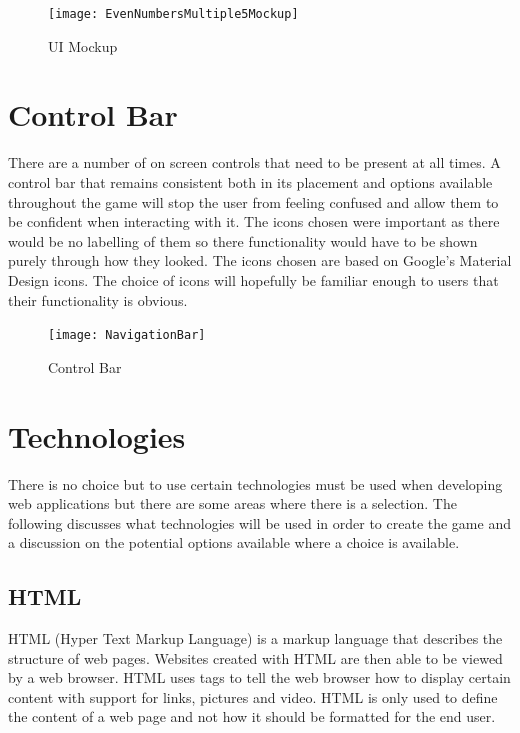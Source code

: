 \documentclass[12pt,a4paper]{report}
\begin{document}
\begin{figure}[h]
  \centering
  \begin{minipage}[b]{1\textwidth}
    \texttt{[image: EvenNumbersMultiple5Mockup]}
    \caption{UI Mockup}
  \end{minipage}
\end{figure}
\FloatBarrier

\section{Control Bar}
There are a number of on screen controls that need to be present at all times. A control bar that remains consistent both in its placement and options available throughout the game will stop the user from feeling confused and allow them to be confident when interacting with it. The icons chosen were important as there would be no labelling of them so there functionality would have to be shown purely through how they looked. The icons chosen are based on Google's Material Design icons. The choice of icons will hopefully be familiar enough to users that their functionality is obvious.

\begin{figure}[h]
\centering
    \texttt{[image: NavigationBar]}
    \caption{Control Bar}
    \label{fig:floodFillBad}
\end{figure}
\FloatBarrier

\section{Technologies}
There is no choice but to use certain technologies must be used when developing web applications but there are some areas where there is a selection. The following discusses what technologies will be used in order to create the game and a discussion on the potential options available where a choice is available. 

\subsection{HTML}
HTML (Hyper Text Markup Language) is a markup language that describes the structure of web pages. Websites created with HTML are then able to be viewed by a web browser. HTML uses tags to tell the web browser how to display certain content with support for links, pictures and video. HTML is only used to define the content of a web page and not how it should be formatted for the end user.
\end{document}
